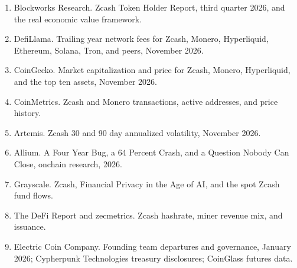 \documentclass[11pt]{article}
\begin{document}
\begin{enumerate}[leftmargin=1.5em,itemsep=2pt,topsep=2pt]
  \item Blockworks Research. Zcash Token Holder Report, third quarter 2026, and the real economic value framework.
  \item DefiLlama. Trailing year network fees for Zcash, Monero, Hyperliquid, Ethereum, Solana, Tron, and peers, November 2026.
  \item CoinGecko. Market capitalization and price for Zcash, Monero, Hyperliquid, and the top ten assets, November 2026.
  \item CoinMetrics. Zcash and Monero transactions, active addresses, and price history.
  \item Artemis. Zcash 30 and 90 day annualized volatility, November 2026.
  \item Allium. A Four Year Bug, a 64 Percent Crash, and a Question Nobody Can Close, onchain research, 2026.
  \item Grayscale. Zcash, Financial Privacy in the Age of AI, and the spot Zcash fund flows.
  \item The DeFi Report and zecmetrics. Zcash hashrate, miner revenue mix, and issuance.
  \item Electric Coin Company. Founding team departures and governance, January 2026; Cypherpunk Technologies treasury disclosures; CoinGlass futures data.
\end{enumerate}
\end{document}
